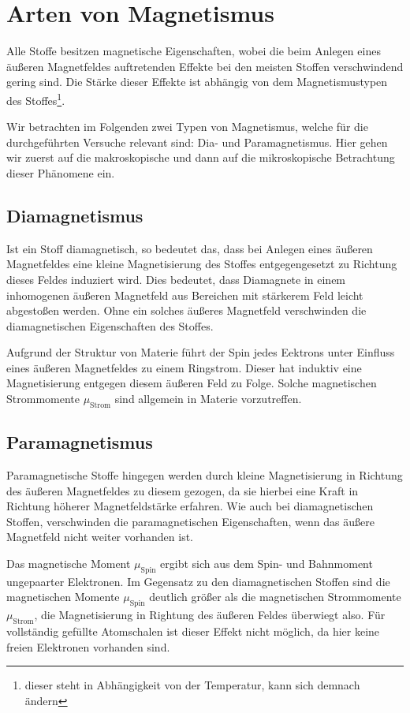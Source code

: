 \documentclass[11pt,a4paper,titlepage, ngerman]{article}
\begin{document}
	\section{Arten von Magnetismus}
				
		Alle Stoffe besitzen magnetische Eigenschaften, wobei die beim Anlegen eines äußeren Magnetfeldes auftretenden Effekte bei den meisten Stoffen verschwindend gering sind. Die Stärke dieser Effekte ist abhängig von dem Magnetismustypen des Stoffes\footnote{dieser steht in Abhängigkeit von der Temperatur, kann sich demnach ändern}. 
				
		Wir betrachten im Folgenden zwei Typen von Magnetismus, welche für die durchgeführten Versuche relevant sind: Dia- und Paramagnetismus. Hier gehen wir zuerst auf die makroskopische und dann auf die mikroskopische Betrachtung dieser Phänomene ein.
		
		\subsection{Diamagnetismus}
		
			Ist ein Stoff diamagnetisch, so bedeutet das, dass bei Anlegen eines äußeren Magnetfeldes eine kleine Magnetisierung des Stoffes entgegengesetzt zu Richtung dieses Feldes induziert wird.
			Dies bedeutet, dass Diamagnete in einem inhomogenen äußeren Magnetfeld aus Bereichen mit stärkerem Feld leicht abgestoßen werden. Ohne ein solches äußeres Magnetfeld verschwinden die diamagnetischen Eigenschaften des Stoffes.

			Aufgrund der Struktur von Materie führt der Spin jedes Eektrons unter Einfluss eines äußeren Magnetfeldes zu einem Ringstrom. 
			Dieser hat induktiv eine Magnetisierung entgegen diesem äußeren Feld zu Folge.
			Solche magnetischen Strommomente $\mu _\text{Strom}$ sind allgemein in Materie vorzutreffen.
				
		\subsection{Paramagnetismus}
			
			Paramagnetische Stoffe hingegen werden durch kleine Magnetisierung in Richtung des äußeren Magnetfeldes zu diesem gezogen, da sie hierbei eine Kraft in Richtung höherer Magnetfeldstärke erfahren. 
			Wie auch bei diamagnetischen Stoffen, verschwinden die paramagnetischen Eigenschaften, wenn das äußere Magnetfeld nicht weiter vorhanden ist.
			
			Das magnetische	Moment $\mu _\text{Spin}$ ergibt sich aus dem Spin- und Bahnmoment ungepaarter Elektronen.
			Im Gegensatz zu den diamagnetischen Stoffen sind die magnetischen Momente $\mu _\text{Spin}$ deutlich größer als die magnetischen Strommomente $\mu _\text{Strom}$, die Magnetisierung in Rightung des äußeren Feldes überwiegt also.
			Für vollständig gefüllte Atomschalen ist dieser Effekt nicht möglich, da hier keine freien Elektronen vorhanden sind.			
			
\end{document}
